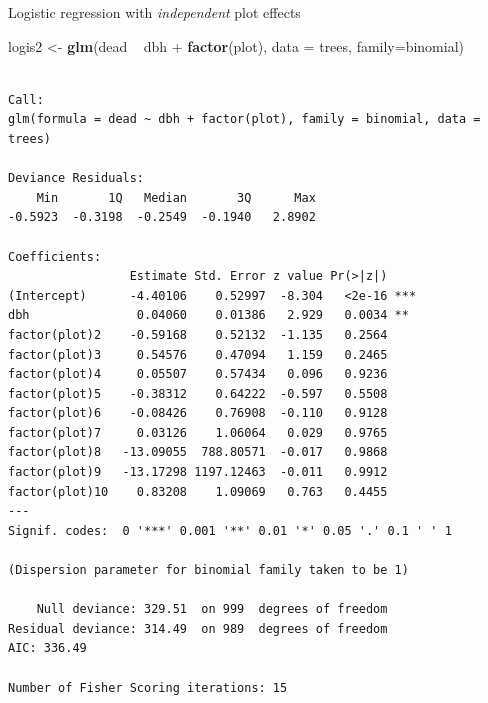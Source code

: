 \documentclass[10pt,ignorenonframetext,]{beamer}
\newenvironment{Shaded}{\begin{snugshade}}{\end{snugshade}}
\newcommand{\KeywordTok}[1]{\textcolor[rgb]{0.13,0.29,0.53}{\textbf{{#1}}}}
\newcommand{\DataTypeTok}[1]{\textcolor[rgb]{0.13,0.29,0.53}{{#1}}}
\newcommand{\StringTok}[1]{\textcolor[rgb]{0.31,0.60,0.02}{{#1}}}
\newcommand{\NormalTok}[1]{{#1}}
\begin{document}
\begin{frame}[fragile]{Logistic regression with \emph{independent} plot
effects}

\begin{Shaded}
\begin{Highlighting}[]
\NormalTok{logis2 <-}\StringTok{ }\KeywordTok{glm}\NormalTok{(dead ~}\StringTok{ }\NormalTok{dbh +}\StringTok{ }\KeywordTok{factor}\NormalTok{(plot), }\DataTypeTok{data =} \NormalTok{trees, }\DataTypeTok{family=}\NormalTok{binomial)}
\end{Highlighting}
\end{Shaded}

\begin{verbatim}

Call:
glm(formula = dead ~ dbh + factor(plot), family = binomial, data = trees)

Deviance Residuals: 
    Min       1Q   Median       3Q      Max  
-0.5923  -0.3198  -0.2549  -0.1940   2.8902  

Coefficients:
                 Estimate Std. Error z value Pr(>|z|)    
(Intercept)      -4.40106    0.52997  -8.304   <2e-16 ***
dbh               0.04060    0.01386   2.929   0.0034 ** 
factor(plot)2    -0.59168    0.52132  -1.135   0.2564    
factor(plot)3     0.54576    0.47094   1.159   0.2465    
factor(plot)4     0.05507    0.57434   0.096   0.9236    
factor(plot)5    -0.38312    0.64222  -0.597   0.5508    
factor(plot)6    -0.08426    0.76908  -0.110   0.9128    
factor(plot)7     0.03126    1.06064   0.029   0.9765    
factor(plot)8   -13.09055  788.80571  -0.017   0.9868    
factor(plot)9   -13.17298 1197.12463  -0.011   0.9912    
factor(plot)10    0.83208    1.09069   0.763   0.4455    
---
Signif. codes:  0 '***' 0.001 '**' 0.01 '*' 0.05 '.' 0.1 ' ' 1

(Dispersion parameter for binomial family taken to be 1)

    Null deviance: 329.51  on 999  degrees of freedom
Residual deviance: 314.49  on 989  degrees of freedom
AIC: 336.49

Number of Fisher Scoring iterations: 15
\end{verbatim}

\end{frame}
\end{document}
